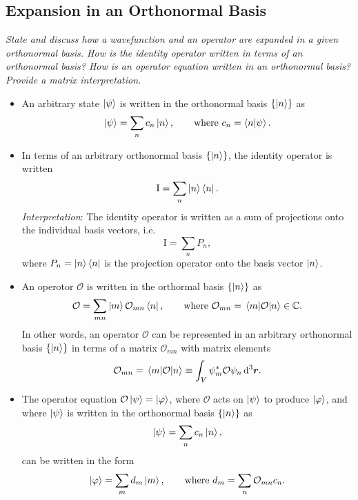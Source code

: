 \documentclass[11pt, a4paper]{article}
\newcommand{\diff}{\mathop{}\!\mathrm{d}} %
\newcommand{\dr}{\diff^{3} \r}  %
\renewcommand{\vec}[1]{\bm{#1}}  %
\renewcommand{\r}{\vec{r}}  %
\renewcommand{\O}{\mathcal{O}}  %
\begin{document}
\subsection{Expansion in an Orthonormal Basis}
\textit{State and discuss how a wavefunction and an operator are expanded in a given orthonormal basis. How is the identity operator written in terms of an orthonormal basis? How is an operator equation written in an orthonormal basis? Provide a matrix interpretation.}
\begin{itemize}
    \item An arbitrary state $ \ket{\psi} $ is written in the orthonormal basis $ \{\ket{n}\} $ as
    \begin{equation*}
        \ket{\psi} = \sum_{n}c_{n}\ket{n}, \qquad \text{where } c_{n} = \braket{n}{\psi}.
    \end{equation*}

    \item In terms of an arbitrary orthonormal basis $ \{\ket{n}\} $, the identity operator is written
    \begin{equation*}
        \mathrm{I} = \sum_{n} \ket{n} \bra{n}.
    \end{equation*}
    \textit{Interpretation}: The identity operator is written as a sum of projections onto the individual basis vectors, i.e.
    \begin{equation*}
        \mathrm{I} = \sum_{n} P_{n},
    \end{equation*}
    where $ P_{n} = \ket{n}\bra{n} $ is the projection operator onto the basis vector $ \ket{n} $.
    
    
    \item An operotor $ \O $ is written in the orthormal basis $ \{\ket{n}\} $ as
    \begin{equation*}
        \O = \sum_{mn} \ket{m} \O_{mn} \bra{n}, \qquad \text{where } \O_{mn} = \mel{m}{\O}{n} \in \mathbb{C}.
    \end{equation*}
	In other words, an operator $ \O $ can be represented in an arbitrary orthonormal basis $ \{\ket{n}\} $ in terms of a matrix $ \O_{mn} $ with matrix elements
	\begin{equation*}
		\O_{mn} = \mel{m}{\O}{n} \equiv \int_{V} \psi_{m}^{*}\O \psi_{n} \dr.
	\end{equation*}

    \item The operator equation $ \O \ket{\psi} = \ket{\varphi} $, where $ \O $ acts on $ \ket{\psi} $ to produce $ \ket{\varphi} $, and where $ \ket{\psi} $ is written in the orthonormal basis $ \{\ket{n}\} $ as
    \begin{equation*}
        \ket{\psi} = \sum_{n} c_{n} \ket{n},
    \end{equation*}
    can be written in the form 
    \begin{equation*}
        \ket{\varphi} = \sum_{m}d_{m}\ket{m}, \qquad \text{where } d_{m} = \sum_{n} \O_{mn} c_{n}.
    \end{equation*}
    

\end{itemize}
\end{document}
